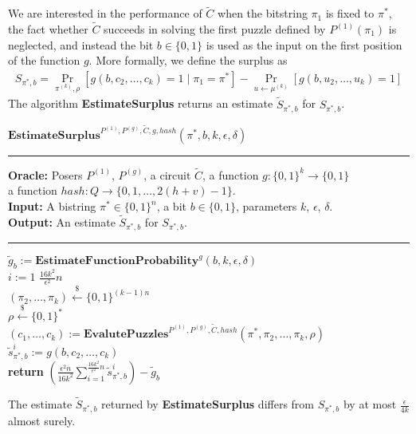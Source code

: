 We are interested in the performance of $\widetilde{C}$ when the bitstring $\pi_1$ is fixed to $\pi^*$,
the fact whether $\widetilde{C}$ succeeds in solving the first puzzle defined by $P^{(1)}(\pi_1)$ is neglected, and
instead the bit $b \in \{0,1\}$ is used as the input on the first position of the function $g$.
More formally, we define the surplus as
\begin{align}
  \label{eq:s_pi_b}
S_{\pi^*, b} = \underset{\pi^{(k)}, \rho}{\Pr}\left[g(b, c_2, \dots, c_k) = 1 \mid \pi_1 = \pi^*\right] - \underset{u \leftarrow \mu^{(k)}}{\Pr}\left[g(b, u_2, \dots, u_k) = 1\right]
\end{align}
%
The algorithm \textbf{EstimateSurplus} returns an estimate $\widetilde{S}_{\pi^*, b}$ for $S_{\pi^*, b}$.
%
\begin{codeblock}
  $\textbf{EstimateSurplus}^{P^{(1)}, P^{(g)}, \widetilde{C}, g, hash}(\pi^*, b, k, \epsilon, \delta)$
  \medskip
  \hrule
  \medskip
  \textbf{Oracle:} Posers $P^{(1)}$, $P^{(g)}$, a circuit $\widetilde{C}$, a function $g: \{0,1\}^{k} \rightarrow \{0,1\}$ \\
  \IndII a function $hash : Q \rightarrow \{0,1,\dots, 2(h+v)-1\}$.\\
  \textbf{Input:} A bistring $\pi^* \in \{0,1\}^{n}$, a bit $b \in \{0,1\}$, parameters $k$, $\epsilon$, $\delta$.\\
  \textbf{Output:} An estimate $\widetilde{S}_{\pi^*, b}$ for $S_{\pi^*, b}$.
  \medskip\hrule\medskip
  $\widetilde{g}_b := \textbf{EstimateFunctionProbability}^{g}(b, k, \epsilon, \delta)$ \\
  \For $i:=1$ \To $\frac{16k^2}{\epsilon^2}n$ \Do \\
  \IndI $(\pi_{2}, \dots, \pi_k) \xleftarrow{\$} \{0,1\}^{(k-1)n}$\\
  \IndI $\rho \xleftarrow{\$} \{0,1\}^{*}$\\
  \IndI $(c_1, \dots, c_k) := \textbf{EvalutePuzzles}^{P^{(1)}, P^{(g)}, \widetilde{C}, hash}(\pi^*, \pi_2, \dots, \pi_k, \rho)$\\
  \IndI $\widetilde{s}_{\pi^*,b}^i := g(b, c_{2}, \dots, c_k)$\\
  \textbf{return} $\left(\frac{\epsilon^2 n}{16k^2} \sum_{i=1}^{\frac{16k^2}{\epsilon^2} n} \widetilde{s}_{\pi^*,b}^i \right) - \widetilde{g}_b$\\
\end{codeblock}
%
\begin{lemma}
  \label{lemma:surplus_estimate}
The estimate $\widetilde{S}_{\pi^*,b}$ returned by \textbf{EstimateSurplus} differs from $S_{\pi^*, b}$ by at most $\frac{\epsilon}{4k}$ almost surely.
\end{lemma}

